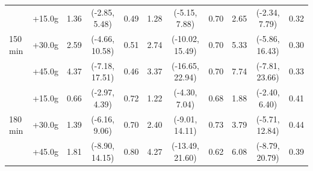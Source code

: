 \begin{table}[ht]
{\begin{tabular}{llccccccccc}
\midrule
\multirow{3}{*}{150 min} & +15.0g & 1.36 & (-2.85, 5.48) & 0.49 & 1.28 & (-5.15, 7.88) & 0.70 & 2.65 & (-2.34, 7.79) & 0.32 \\
 & +30.0g & 2.59 & (-4.66, 10.58) & 0.51 & 2.74 & (-10.02, 15.49) & 0.70 & 5.33 & (-5.86, 16.43) & 0.30 \\
 & +45.0g & 4.37 & (-7.18, 17.51) & 0.46 & 3.37 & (-16.65, 22.94) & 0.70 & 7.74 & (-7.81, 23.66) & 0.33 \\
\midrule
\multirow{3}{*}{180 min} & +15.0g & 0.66 & (-2.97, 4.39) & 0.72 & 1.22 & (-4.30, 7.04) & 0.68 & 1.88 & (-2.40, 6.40) & 0.41 \\
 & +30.0g & 1.39 & (-6.16, 9.06) & 0.70 & 2.40 & (-9.01, 14.11) & 0.73 & 3.79 & (-5.71, 12.84) & 0.44 \\
 & +45.0g & 1.81 & (-8.90, 14.15) & 0.80 & 4.27 & (-13.49, 21.60) & 0.62 & 6.08 & (-8.79, 20.79) & 0.39 \\
\bottomrule
\end{tabular}%
}
\end{table}
